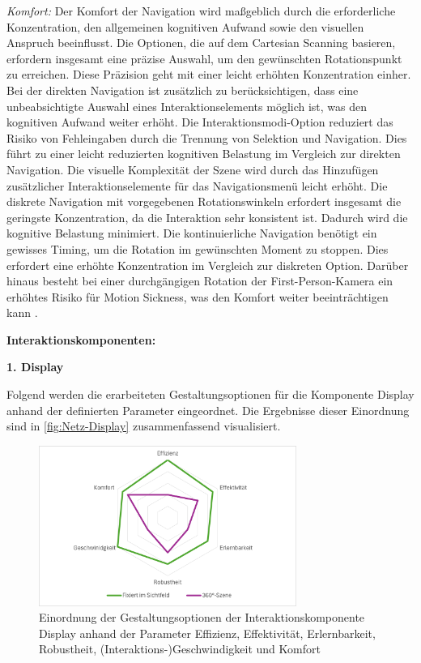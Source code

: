 \textit{Komfort:}
Der Komfort der Navigation wird maßgeblich durch die erforderliche Konzentration, den allgemeinen kognitiven Aufwand sowie den visuellen Anspruch beeinflusst. Die Optionen, die auf dem Cartesian Scanning basieren, erfordern insgesamt eine präzise Auswahl, um den gewünschten Rotationspunkt zu erreichen. Diese Präzision geht mit einer leicht erhöhten Konzentration einher. Bei der direkten Navigation ist zusätzlich zu berücksichtigen, dass eine unbeabsichtigte Auswahl eines Interaktionselements möglich ist, was den kognitiven Aufwand weiter erhöht. Die Interaktionsmodi-Option reduziert das Risiko von Fehleingaben durch die Trennung von Selektion und Navigation. Dies führt zu einer leicht reduzierten kognitiven Belastung im Vergleich zur direkten Navigation. Die visuelle Komplexität der Szene wird durch das Hinzufügen zusätzlicher Interaktionselemente für das Navigationsmenü leicht erhöht. Die diskrete Navigation mit vorgegebenen Rotationswinkeln erfordert insgesamt die geringste Konzentration, da die Interaktion sehr konsistent ist. Dadurch wird die kognitive Belastung minimiert.
Die kontinuierliche Navigation benötigt ein gewisses Timing, um die Rotation im gewünschten Moment zu stoppen. Dies erfordert eine erhöhte Konzentration im Vergleich zur diskreten Option. Darüber hinaus besteht bei einer durchgängigen Rotation der First-Person-Kamera ein erhöhtes Risiko für Motion Sickness, was den Komfort weiter beeinträchtigen kann \citep{10.1007/s10055-020-00425-x, 8797722}.


{\normalfont \bfseries Interaktionskomponenten:} 

\textbf{1. Display}

Folgend werden die erarbeiteten Gestaltungsoptionen für die Komponente Display anhand der definierten Parameter eingeordnet. Die Ergebnisse dieser Einordnung sind in \autoref{fig:Netz-Display} zusammenfassend visualisiert.

\begin{figure}[tbh]
    \centering
    \includegraphics[width=0.75\textwidth]{images/Netzdiagramm-Display.png}
    \caption{Einordnung der Gestaltungsoptionen der Interaktionskomponente Display anhand der Parameter Effizienz, Effektivität, Erlernbarkeit, Robustheit, (Interaktions-)Geschwindigkeit und Komfort}
    \label{fig:Netz-Display}
\end{figure}

